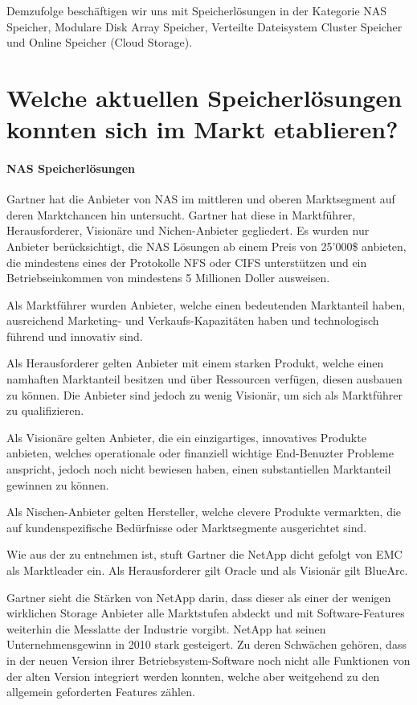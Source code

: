 Demzufolge beschäftigen wir uns mit Speicherlösungen in der Kategorie NAS Speicher, Modulare Disk Array Speicher, Verteilte Dateisystem Cluster Speicher und Online Speicher (Cloud Storage).

\section{Welche aktuellen Speicherlösungen konnten sich im Markt etablieren? }\label{MarktEtabliert}

\paragraph*{NAS Speicherlösungen}
Gartner hat die Anbieter von NAS im mittleren und oberen Marktsegment auf deren Marktchancen hin untersucht. Gartner hat diese in Marktführer, Herausforderer, Visionäre und Nichen-Anbieter gegliedert. Es wurden nur Anbieter berücksichtigt, die NAS Lösungen ab einem Preis von 25'000\$ anbieten, die mindestens eines der Protokolle NFS oder CIFS unterstützen und ein Betriebseinkommen von mindestens 5 Millionen Doller ausweisen. 

Als Marktführer wurden Anbieter, welche einen bedeutenden Marktanteil haben, ausreichend Marketing- und Verkaufs-Kapazitäten haben und technologisch führend und innovativ sind.

Als Herausforderer gelten Anbieter mit einem starken Produkt, welche einen namhaften Marktanteil besitzen und über Ressourcen verfügen, diesen ausbauen zu können. Die Anbieter sind jedoch zu wenig Visionär, um sich als Marktführer zu qualifizieren.

Als Visionäre gelten Anbieter, die ein einzigartiges, innovatives Produkte anbieten, welches operationale oder finanziell wichtige End-Benuzter Probleme anspricht, jedoch noch nicht bewiesen haben, einen substantiellen Marktanteil gewinnen zu können.

Als Nischen-Anbieter gelten Hersteller, welche clevere Produkte vermarkten, die auf kundenspezifische Bedürfnisse oder Marktsegmente ausgerichtet sind.

Wie aus der  zu entnehmen ist, stuft Gartner die NetApp dicht gefolgt von EMC als Marktleader ein. Als Herausforderer gilt Oracle und als Visionär gilt BlueArc.

Gartner sieht die Stärken von NetApp darin, dass dieser als einer der wenigen wirklichen Storage Anbieter alle Marktstufen abdeckt und mit Software-Features weiterhin die Messlatte der Industrie vorgibt. NetApp hat seinen Unternehmensgewinn in 2010 stark gesteigert. Zu deren Schwächen gehören, dass in der neuen Version ihrer Betriebsystem-Software noch nicht alle Funktionen von der alten Version integriert werden konnten, welche aber weitgehend zu den allgemein geforderten Features zählen.

